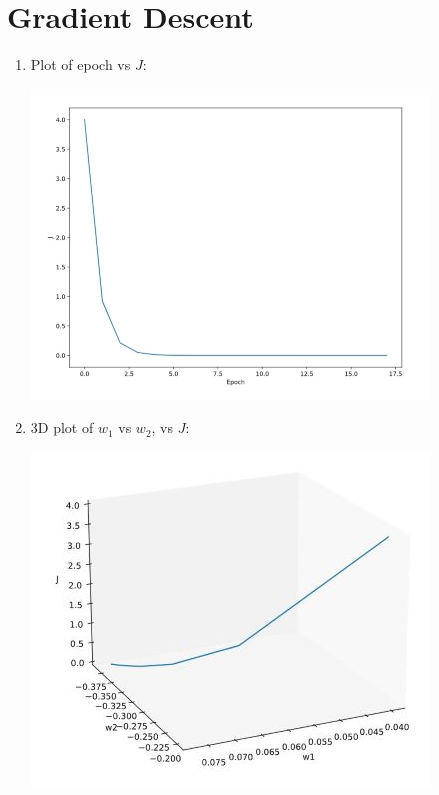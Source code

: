 \documentclass[12pt]{article}
\begin{document}
\begin{enumerate}
\begin{enumerate}
	\end{enumerate}

	

	

\end{enumerate}

\newpage

\section{Gradient Descent}

	\begin{enumerate}
		
		\item Plot of epoch vs $J$:\\
		
		\begin{center}
			\includegraphics{epoch_vs_J}
		\end{center}
		
		\item 3D plot of $w_1$ vs $w_2$, vs $J$:\\
		
		\begin{center}
			\includegraphics{w1_vs_w2_vs_J}
		\end{center}
		

\end{enumerate}
\end{document}
